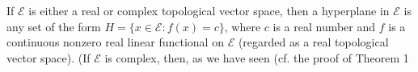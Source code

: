 If $\mathcal{E}$ is either a real or complex topological vector space, then a hyperplane in $\mathcal{E}$ is any set of the form $H = \{x \in \mathcal{E} : f(x) = c\}$, where $c$ is a real number and $f$ is a continuous nonzero real linear functional on $\mathcal{E}$ (regarded as a real topological vector space). (If $\mathcal{E}$ is complex, then, as we have seen (cf. the proof of Theorem 1
